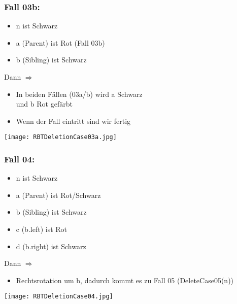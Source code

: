 		\centerline{\noindent\makebox[0.5\linewidth]{\rule{0.5\paperwidth}{0.4pt}}}
		\subsubsection{Fall 03b:}
			\begin{minipage}[t]{0.5\textwidth}
				\vspace{0.1cm}
				\begin{itemize}
					\item n ist Schwarz
					\item a (Parent) ist Rot (Fall 03b)
					\item b (Sibling) ist  Schwarz \\
				\end{itemize}

				Dann $\Rightarrow$
				\begin{itemize}
					\item In beiden Fällen (03a/b) wird a Schwarz \\
						und b Rot gefärbt
					\item Wenn der Fall eintritt sind wir fertig
				\end{itemize}
			\end{minipage}
			\begin{minipage}[t]{0.45\textwidth}
				\begin{center}
					\texttt{[image: RBTDeletionCase03a.jpg]}
				\end{center}
			\end{minipage}
			\vspace{0.9cm}


		\centerline{\noindent\makebox[0.5\linewidth]{\rule{0.5\paperwidth}{0.4pt}}}
		\subsubsection{Fall 04:}
			\begin{minipage}[t]{0.5\textwidth}
				\begin{itemize}
					\item n ist Schwarz
					\item a (Parent) ist Rot/Schwarz
					\item b (Sibling) ist Schwarz
					\item c (b.left) ist Rot
					\item d (b.right) ist Schwarz
				\end{itemize}

				Dann $\Rightarrow$
				\begin{itemize}
					\item Rechtsrotation um b, dadurch kommt es zu Fall 05 (DeleteCase05(n))
				\end{itemize}
			\end{minipage}
			\begin{minipage}[t]{0.45\textwidth}
				\begin{center}
					\texttt{[image: RBTDeletionCase04.jpg]}	
				\end{center}
			\end{minipage}
			\vspace{0.9cm}


